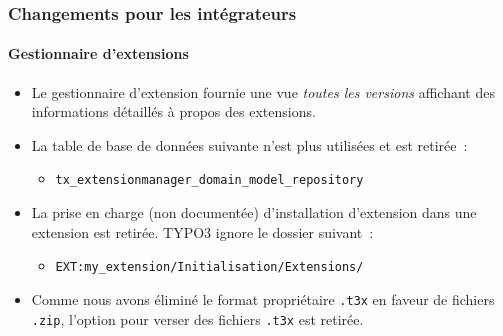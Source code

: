 %

\begin{frame}[fragile]
	\frametitle{Changements pour les intégrateurs}
	\framesubtitle{Gestionnaire d'extensions}

	\begin{itemize}

		\item Le gestionnaire d'extension fournie une vue \textit{toutes les versions}
			affichant des informations détaillés à propos des extensions.

		\item La table de base de données suivante n'est plus utilisées et est retirée~:
			\begin{itemize}\small
				\item \texttt{tx\_extensionmanager\_domain\_model\_repository}
			\end{itemize}\normalsize
			\vspace{0.2cm}

		\item La prise en charge (non documentée) d'installation d'extension dans une extension
			est retirée. TYPO3 ignore le dossier suivant~:
			\begin{itemize}\small
				\item \texttt{EXT:my\_extension/Initialisation/Extensions/}
			\end{itemize}
			\vspace{0.2cm}

		\item Comme nous avons éliminé le format propriétaire \texttt{.t3x} en faveur
			de fichiers \texttt{.zip}, l'option pour verser des fichiers \texttt{.t3x}
			est retirée.

	\end{itemize}

\end{frame}


